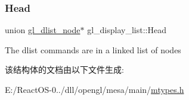 \subsubsection{\texorpdfstring{Head}{Head}}
{\footnotesize\ttfamily union \hyperlink{uniongl__dlist__node}{gl\+\_\+dlist\+\_\+node}$\ast$ gl\+\_\+display\+\_\+list\+::\+Head}

The dlist commands are in a linked list of nodes 

该结构体的文档由以下文件生成\+:\begin{DoxyCompactItemize}
\item 
E\+:/\+React\+O\+S-\/0../dll/opengl/mesa/main/\hyperlink{mtypes_8h}{mtypes.\+h}\end{DoxyCompactItemize}
